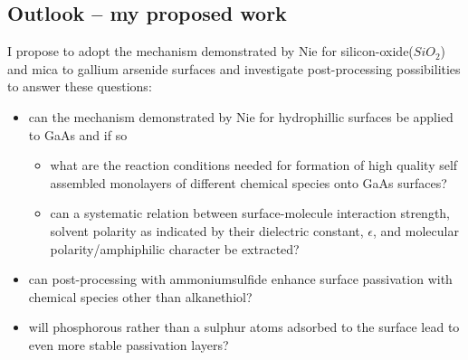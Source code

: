 \documentclass[a4paper]{article}
\begin{document}
\subsection*{Outlook -- my proposed work}
I propose to adopt the mechanism demonstrated by Nie for silicon-oxide($SiO_2$) and mica to gallium arsenide surfaces and investigate post-processing possibilities to answer these questions:
\begin{itemize}
\item can the mechanism demonstrated by Nie for hydrophillic surfaces be applied to GaAs and if so
	\begin{itemize}
	\item what are the reaction conditions needed for formation of high quality self assembled monolayers of different chemical species onto GaAs surfaces? 
	\item can a systematic relation between surface-molecule interaction strength, solvent polarity as indicated by their dielectric constant, $\epsilon$, and molecular polarity/amphiphilic character be extracted?
	\end{itemize}
\item can post-processing with ammoniumsulfide enhance surface passivation with chemical species other than alkanethiol?
\item will phosphorous rather than a sulphur atoms adsorbed to the surface lead to even more stable passivation layers?
\end{itemize}
\end{document}
